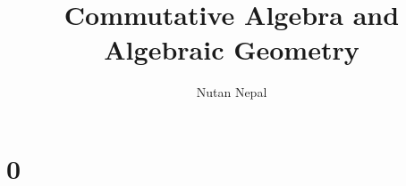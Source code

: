 
\title{Commutative Algebra and Algebraic Geometry}
\author{Nutan Nepal}



\maketitle
\section*{0}

\begin{problems}
\end{problems}
\begin{questions}
    
    
    
    
    
    
\end{questions}

\section*{}

